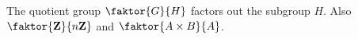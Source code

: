 \documentclass{article}
\begin{document}
The quotient group $\faktor{G}{H}$ factors out the subgroup $H$.
Also $\faktor{\mathbf{Z}}{n\mathbf{Z}}$ and $\faktor{A \times B}{A}$.
\end{document}
